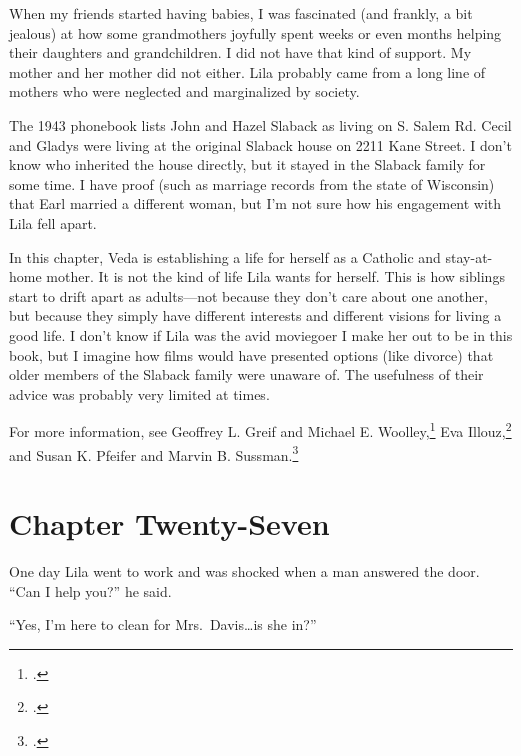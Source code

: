\documentclass[
  american,
  letterpaper,
]{book}
\begin{document}
When my friends started having babies, I was fascinated (and frankly, a
bit jealous) at how some grandmothers joyfully spent weeks or even
months helping their daughters and grandchildren. I did not have that
kind of support. My mother and her mother did not either. Lila probably
came from a long line of mothers who were neglected and marginalized by
society.

The 1943 phonebook lists John and Hazel Slaback as living on S. Salem
Rd. Cecil and Gladys were living at the original Slaback house on 2211
Kane Street. I don't know who inherited the house directly, but it
stayed in the Slaback family for some time. I have proof (such as
marriage records from the state of Wisconsin) that Earl married a
different woman, but I'm not sure how his engagement with Lila fell
apart.

In this chapter, Veda is establishing a life for herself as a Catholic
and stay-at-home mother. It is not the kind of life Lila wants for
herself. This is how siblings start to drift apart as adults---not
because they don't care about one another, but because they simply have
different interests and different visions for living a good life. I
don't know if Lila was the avid moviegoer I make her out to be in this
book, but I imagine how films would have presented options (like
divorce) that older members of the Slaback family were unaware of. The
usefulness of their advice was probably very limited at times.

For more information, see Geoffrey L. Greif and Michael E.
Woolley,\footnote{.} Eva
Illouz,\footnote{.} and Susan K. Pfeifer and
Marvin B. Sussman.\footnote{.}


\chapter{Chapter Twenty-Seven}\label{chapter-twenty-seven}

One day Lila went to work and was shocked when a man answered the door.
``Can I help you?'' he said.

``Yes, I'm here to clean for Mrs.~Davis\ldots is she in?''
\end{document}
